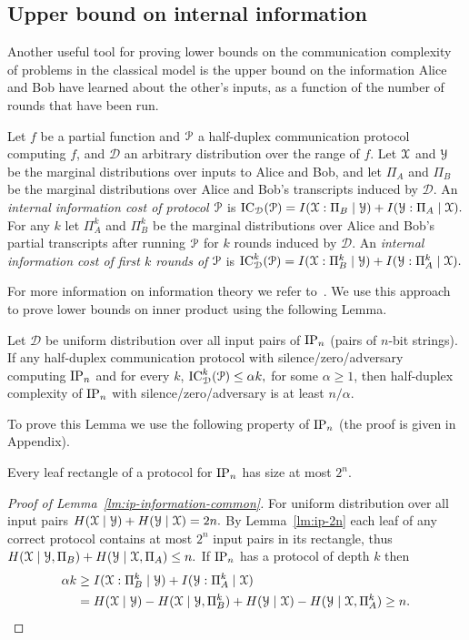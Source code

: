 \subsection{Upper bound on internal information}\label{subsec:information}
Another useful tool for proving lower bounds on the communication complexity of problems in the classical model is the upper bound on the information Alice and Bob have learned about the other's inputs, as a function of the number of rounds that have been run. 
\begin{definition}
	Let $f$ be a partial function and $\mathcal{P}$ a half-duplex communication protocol computing $f$, and $\mathcal{D}$ an arbitrary distribution over the range of $f$.
	Let $\mathcal{X}$ and $\mathcal{Y}$ be the marginal distributions over inputs to Alice and Bob,
	and let $\Pi_A$ and $\Pi_B$ be the marginal distributions over Alice and Bob's transcripts 
	induced by $\mathcal{D}$.
	An \emph{internal information cost of protocol $\mathcal{P}$} is
	\(
	\mathrm{IC}_\mathcal{D}(\mathcal{P}) = I(\mathcal{X}:\Pi_B\mid\mathcal{Y}) + I(\mathcal{Y}:\Pi_A\mid\mathcal{X}).
	\)
	For any $k$ let $\Pi_A^k$ and $\Pi_B^k$ be the marginal distributions over Alice and Bob's partial transcripts after running $\mathcal{P}$ for $k$ rounds induced by $\mathcal{D}$.
	An \emph{internal information cost of first $k$ rounds of $\mathcal{P}$} is
	\(
	\mathrm{IC}_\mathcal{D}^k(\mathcal{P}) = I(\mathcal{X}:\Pi_B^k\mid\mathcal{Y}) + I(\mathcal{Y}:\Pi_A^k\mid\mathcal{X}).
	\)
\end{definition}

For more information on information theory we refer to~\cite{CTJ2006,GMWW17}. We use this approach
to prove lower bounds on inner product using the following Lemma.

\begin{lemma}\label{lm:ip-information-common}
	Let $\mathcal{D}$ be uniform distribution over all input pairs of $\mathrm{IP}_n$ (pairs of $n$-bit strings).
	If any half-duplex communication protocol with silence/zero/adversary computing $\mathrm{IP}_n$ and for every $k$,
	\(
	\mathrm{IC}_\mathcal{D}^k(\mathcal{P}) \le \alpha k,
	\)
	for some $\alpha\ge 1$, then half-duplex complexity of $\mathrm{IP}_n$ with silence/zero/adversary is at least $n/\alpha$. 
\end{lemma}
To prove this Lemma we use the following property of $\mathrm{IP}_n$ (the proof is given in Appendix).
\begin{lemma}\label{lm:ip-2n}
	Every leaf rectangle of a protocol for $\mathrm{IP}_n$ has size at most $2^n$. 
\end{lemma}
\begin{proof}[Proof of Lemma~\ref{lm:ip-information-common}]
For uniform distribution over all input pairs $H(\mathcal{X}\mid\mathcal{Y})+H(\mathcal{Y}\mid\mathcal{X})=2n.$
By Lemma~\ref{lm:ip-2n} each leaf of any correct protocol contains at most $2^n$ input pairs in its rectangle, thus $H(\mathcal{X}\mid\mathcal{Y},\Pi_B)+H(\mathcal{Y}\mid\mathcal{X},\Pi_A)\leq n.$ If $\mathrm{IP}_n$ has a protocol of depth $k$ then
\begin{align*}
\alpha k &\ge I(\mathcal{X}:\Pi_B^k\mid\mathcal{Y}) + I(\mathcal{Y}:\Pi_A^k\mid\mathcal{X}) \\
&= 
H(\mathcal{X}\mid\mathcal{Y}) - H(\mathcal{X}\mid\mathcal{Y},\Pi_B^k) + H(\mathcal{Y}\mid\mathcal{X}) - H(\mathcal{Y}\mid\mathcal{X},\Pi_A^k) \ge n.
\end{align*}
\end{proof}

